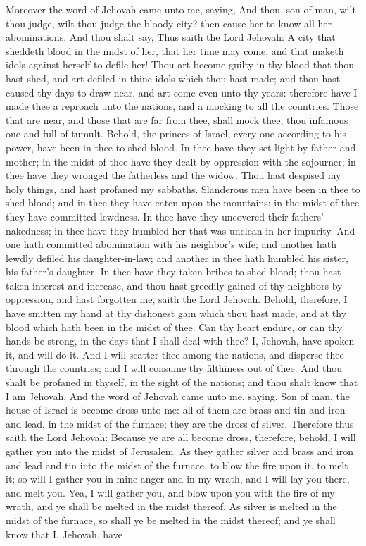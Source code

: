 Moreover the word of Jehovah came unto me, saying, And thou, son of man, wilt thou judge, wilt thou judge the bloody city? then cause her to know all her abominations. And thou shalt say, Thus saith the Lord Jehovah: A city that sheddeth blood in the midst of her, that her time may come, and that maketh idols against herself to defile her! Thou art become guilty in thy blood that thou hast shed, and art defiled in thine idols which thou hast made; and thou hast caused thy days to draw near, and art come even unto thy years: therefore have I made thee a reproach unto the nations, and a mocking to all the countries. Those that are near, and those that are far from thee, shall mock thee, thou infamous one and full of tumult.  Behold, the princes of Israel, every one according to his power, have been in thee to shed blood. In thee have they set light by father and mother; in the midst of thee have they dealt by oppression with the sojourner; in thee have they wronged the fatherless and the widow. Thou hast despised my holy things, and hast profaned my sabbaths. Slanderous men have been in thee to shed blood; and in thee they have eaten upon the mountains: in the midst of thee they have committed lewdness. In thee have they uncovered their fathers’ nakedness; in thee have they humbled her that was unclean in her impurity. And one hath committed abomination with his neighbor’s wife; and another hath lewdly defiled his daughter-in-law; and another in thee hath humbled his sister, his father’s daughter. In thee have they taken bribes to shed blood; thou hast taken interest and increase, and thou hast greedily gained of thy neighbors by oppression, and hast forgotten me, saith the Lord Jehovah.  Behold, therefore, I have smitten my hand at thy dishonest gain which thou hast made, and at thy blood which hath been in the midst of thee. Can thy heart endure, or can thy hands be strong, in the days that I shall deal with thee? I, Jehovah, have spoken it, and will do it. And I will scatter thee among the nations, and disperse thee through the countries; and I will consume thy filthiness out of thee. And thou shalt be profaned in thyself, in the sight of the nations; and thou shalt know that I am Jehovah.  And the word of Jehovah came unto me, saying, Son of man, the house of Israel is become dross unto me: all of them are brass and tin and iron and lead, in the midst of the furnace; they are the dross of silver. Therefore thus saith the Lord Jehovah: Because ye are all become dross, therefore, behold, I will gather you into the midst of Jerusalem. As they gather silver and brass and iron and lead and tin into the midst of the furnace, to blow the fire upon it, to melt it; so will I gather you in mine anger and in my wrath, and I will lay you there, and melt you. Yea, I will gather you, and blow upon you with the fire of my wrath, and ye shall be melted in the midst thereof. As silver is melted in the midst of the furnace, so shall ye be melted in the midst thereof; and ye shall know that I, Jehovah, have 